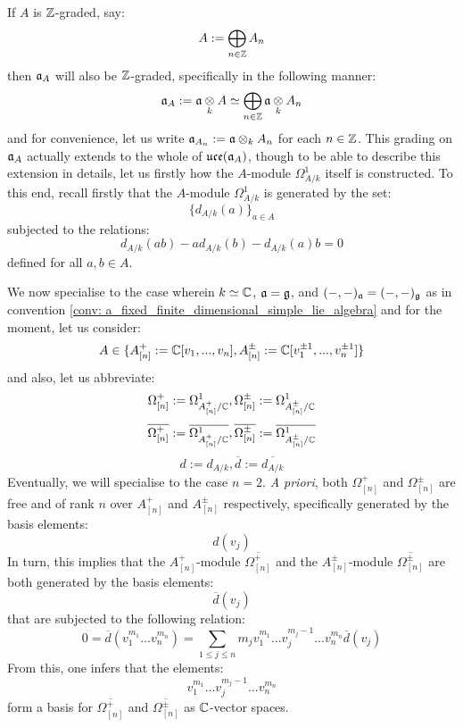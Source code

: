 \begin{remark}
                If $A$ is $\mathbb{Z}$-graded, say:
                    $$A := \bigoplus_{n \in \mathbb{Z}} A_n$$
                then $\mathfrak{a}_A$ will also be $\mathbb{Z}$-graded, specifically in the following manner:
                    $$\a_A := \a \tensor_k A \cong \bigoplus_{n \in \Z} \a \tensor_k A_n$$
                and for convenience, let us write $\a_{A_n} := \a \tensor_k A_n$ for each $n \in \mathbb{Z}$. This grading on $\mathfrak{a}_A$ actually extends to the whole of $\mathfrak{uce}(\mathfrak{a}_A)$, though to be able to describe this extension in details, let us firstly how the $A$-module $\Omega^1_{A/k}$ itself is constructed. To this end, recall firstly that the $A$-module $\Omega^1_{A/k}$ is generated by the set:
                    $$\{d_{A/k}(a)\}_{a \in A}$$
                subjected to the relations:
                    $$d_{A/k}(ab) - a d_{A/k}(b) - d_{A/k}(a) b = 0$$
                defined for all $a, b \in A$. 

                We now specialise to the case wherein $k \simeq \mathbb{C}$, $\mathfrak{a} = \mathfrak{g}$, and $(-, -)_{\mathfrak{a}} = (-, -)_{\mathfrak{g}}$ as in convention \ref{conv: a_fixed_finite_dimensional_simple_lie_algebra} and for the moment, let us consider:
                    $$A \in \{ A_{[n]}^+ := \mathbb{C}[v_1, ..., v_n], A_{[n]}^{\pm} := \mathbb{C}[v_1^{\pm 1}, ..., v_n^{\pm 1}] \}$$
                and also, let us abbreviate:
                    $$\Omega^+_{[n]} := \Omega^1_{A_{[n]}^+/\mathbb{C}}, \Omega^{\pm}_{[n]} := \Omega^1_{A_{[n]}^{\pm}/\mathbb{C}}$$
                    $$\overline{\Omega^+_{[n]}} := \overline{\Omega^1_{A_{[n]}^+/\mathbb{C}}}, \overline{\Omega^{\pm}_{[n]}} := \overline{\Omega^1_{A_{[n]}^{\pm}/\mathbb{C}}}$$
                    $$d := d_{A/k}, \overline{d} := \overline{d_{A/k}}$$
                Eventually, we will specialise to the case $n = 2$. \textit{A priori}, both $\Omega^+_{[n]}$ and $\Omega^{\pm}_{[n]}$ are free and of rank $n$ over $A_{[n]}^+$ and $A_{[n]}^{\pm}$ respectively, specifically generated by the basis elements:
                    $$d(v_j)$$
                In turn, this implies that the $A_{[n]}^+$-module $\overline{\Omega^+_{[n]}}$ and the $A_{[n]}^{\pm}$-module $\overline{\Omega^{\pm}_{[n]}}$ are both generated by the basis elements:
                    $$\overline{d}(v_j)$$
                that are subjected to the following relation:
                    $$0 = \overline{d}( v_1^{m_1} ... v_n^{m_n} ) = \sum_{1 \leq j \leq n} m_j v_1^{m_1} ... v_j^{m_j - 1} ... v_n^{m_n} \overline{d}(v_j)$$
                From this, one infers that the elements:
                    $$v_1^{m_1} ... v_j^{m_j - 1} ... v_n^{m_n}$$
                form a basis for $\overline{\Omega^+_{[n]}}$ and $\overline{\Omega^{\pm}_{[n]}}$ as $\mathbb{C}$-vector spaces. 


\end{remark}
